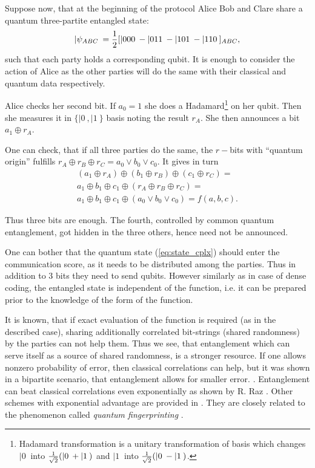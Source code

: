 \documentclass[rmp,12pt,preprint]{revtex4-2}
\begin{document}
Suppose now, that at the beginning of the protocol Alice Bob and Clare
share a quantum three-partite entangled state:
\begin{equation}
|\psi_{ABC}\> = {1\over 2}[|000\> - |011\> - |101\> - |110\>]_{ABC},
\label{eq:state_cplx}
\end{equation}
such that each party holds a corresponding qubit. It is enough to
consider the action of Alice as the other parties will do the same
with their classical and quantum data respectively.

Alice checks her second bit. If $a_0=1$ she does a
Hadamard\footnote{Hadamard transformation is a unitary transformation
  of basis which changes $|0\>$ into ${1\over \sqrt{2}}(|0\> + |1\>)$
  and $|1\>$ into ${1\over \sqrt{2}}(|0\> - |1\>)$.} on her
qubit. Then she measures it in $\{|0\>, |1\>\}$ basis noting the
result $r_A$. She then announces a bit $a_1\oplus r_A$.

One can check, that if all three parties do the same, the $r-$bits
with ``quantum origin'' fulfills $r_A\oplus r_B\oplus r_C =a_0\vee
b_0\vee c_0$. It gives in turn
\begin{eqnarray}
(a_1\oplus r_A)\oplus(b_1\oplus r_B)\oplus(c_1\oplus r_C)= \nonumber \\
a_1\oplus b_1\oplus c_1 \oplus (r_A\oplus r_B\oplus r_C)= \nonumber \\
a_1\oplus b_1 \oplus c_1 \oplus(a_0\vee b_0\vee c_0) = f(a,b,c).
\end{eqnarray}

Thus three bits are enough. The fourth, controlled by common quantum
entanglement, got hidden in the three others, hence need not be
announced.

One can bother that the quantum state (\ref{eq:state_cplx}) should
enter the communication score, as it needs to be distributed among the
parties.  Thus in addition to $3$ bits they need to send qubits.
However similarly as in case of dense coding, the entangled state is
independent of the function, i.e. it can be prepared prior to the
knowledge of the form of the function.

It is known, that if exact evaluation of the function is required (as
in the described case), sharing additionally correlated bit-strings
(shared randomness) by the parties can not help them. Thus we see,
that entanglement which can serve itself as a source of shared
randomness, is a stronger resource. If one allows nonzero probability
of error, then classical correlations can help, but it was shown in a
bipartite scenario, that entanglement allows for smaller error.
\cite{BuhrmanCD1997-complexity}. Entanglement can beat classical
correlations even exponentially as shown by R. Raz
\cite{raz99exponential}. Other schemes with exponential advantage are
provided in \cite{GaKaKeWolf-class-cmplx-gap}. They are closely
related to the phenomenon called {\it quantum fingerprinting}
\cite{Qfprint,GaKeWo-fingerprint}.
\end{document}
